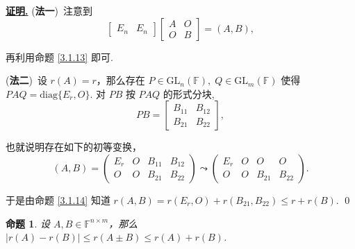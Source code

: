 \documentclass[10pt,openany]{article}
\theoremstyle{thmstyle} %
\theoremstyle{defstyle} %
\theoremstyle{prostyle} %
\newtheorem{proposition}[theorem]{命题}
\theoremstyle{exastyle}
\theoremstyle{remstyle}
\renewenvironment{proof}[1][证明]{\par\underline{\textbf{#1.}} \;\fangsong}{\qed\par}
\newcommand{\F}{\mathbb{F}}
\newcommand{\gfn}{\text{GL}_n(\mathbb{F})}
\newcommand{\gfm}{\text{GL}_m(\mathbb{F})}
\newcommand{\nm}{^{n \times m}}
\newcommand{\diag}{\mathrm{diag}}
\begin{document}
\begin{proof}
	(\textbf{法一})\ 注意到
	\[ \begin{bmatrix}
		E_n & E_n
	\end{bmatrix}\begin{bmatrix}
		A & O \\ O & B
	\end{bmatrix}=(A,B), \]
	
	再利用命题 \ref{3.1.13} 即可.
	
	\vspace{1ex}
	
	(\textbf{法二})\ 设 \( r(A)=r \)，那么存在 \( P \in \gfn, \; Q \in \gfm \) 使得 \( PAQ=\diag\{E_r,O\} \). 对 \( PB \) 按 \( PAQ \) 的形式分块,
	\[ PB=\begin{bmatrix}
		B_{11} & B_{12} \\
		B_{21} & B_{22}
	\end{bmatrix},\]
	
	也就说明存在如下的初等变换，
	\[ (A,B)=\begin{pmatrix}
		E_r & O & B_{11} & B_{12} \\
		O & O & B_{21} & B_{22}
	\end{pmatrix} \leadsto \begin{pmatrix}
	E_r & O & O & O \\
	O & O & B_{21} & B_{22}
	\end{pmatrix}. \]
	
	于是由命题 \ref{3.1.14} 知道 \( r(A,B)=r(E_r,O)+r(B_{21},B_{22}) \leq r+r(B) \).
\end{proof}

\begin{proposition} \label{3.1.20}
	设 \( A, B \in \F\nm \)，那么 \( |r(A)-r(B)| \leq r(A\pm B) \leq r(A)+r(B) \). 
\end{proposition}
\end{document}
